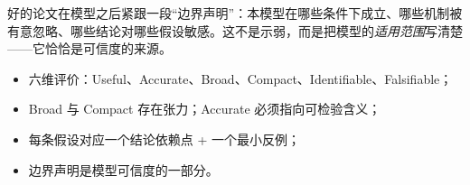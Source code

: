 好的论文在模型之后紧跟一段“边界声明”：本模型在哪些条件下成立、哪些机制被有意忽略、哪些结论对哪些假设敏感。这不是示弱，而是把模型的\emph{适用范围}写清楚——它恰恰是可信度的来源。

\begin{itemize}
  \item 六维评价：Useful、Accurate、Broad、Compact、Identifiable、Falsifiable；
  \item Broad 与 Compact 存在张力；Accurate 必须指向可检验含义；
  \item 每条假设对应一个结论依赖点 + 一个最小反例；
  \item 边界声明是模型可信度的一部分。
\end{itemize}

